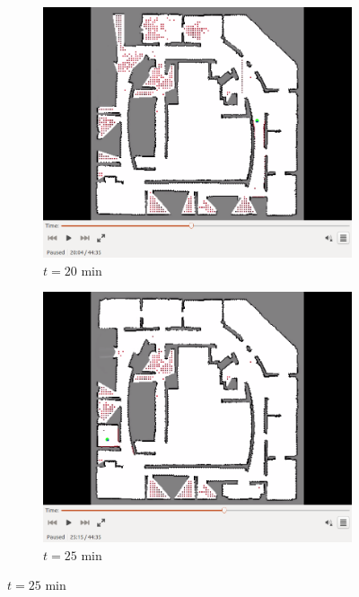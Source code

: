 \documentclass[smallextended]{svjour3}       %
\begin{document}
\begin{figure}[!ht]
\begin{subfigure}[t]{0.3\columnwidth}
        \label{fig:IRL15min}
    \end{subfigure}
    \begin{subfigure}[t]{0.3\columnwidth}
         \centering
         \includegraphics[trim = {4.6cm 3.8cm 4.6cm 0}, clip, width=\textwidth]{20min.png}
        \caption{$t=20$ min}
        \label{fig:IRL20min}
    \end{subfigure}
    \begin{subfigure}[t]{0.3\columnwidth}
           \centering
           \includegraphics[trim = {4.6cm 3.8cm 4.6cm 0}, clip, width=\textwidth]{25min.png}
        \caption{$t=25$ min}

\end{subfigure}
\end{figure}
\end{document}
